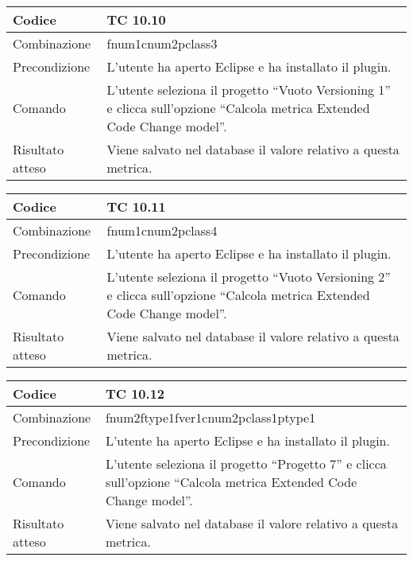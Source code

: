 \begin{table}[ht]
\begin{tabular}{|p{3cm}|p{9cm}|}
\hline
\cellcolor{lightgray}Codice				& TC 10.10								\\
\hline
\cellcolor{lightgray}Combinazione		& fnum1cnum2pclass3									\\
\hline
\cellcolor{lightgray}Precondizione		& L'utente ha aperto Eclipse e ha installato il plugin.		\\
\hline
\cellcolor{lightgray}Comando			& L'utente seleziona il progetto ``Vuoto Versioning 1''  e clicca sull'opzione ``Calcola metrica Extended Code Change model''.	\\
\hline
\cellcolor{lightgray}Risultato atteso	& Viene salvato nel database il valore relativo a questa metrica.\\
\hline
\end{tabular}
\end{table}

\begin{table}[ht]
\begin{tabular}{|p{3cm}|p{9cm}|}
\hline
\cellcolor{lightgray}Codice				& TC 10.11								\\
\hline
\cellcolor{lightgray}Combinazione		& fnum1cnum2pclass4									\\
\hline
\cellcolor{lightgray}Precondizione		& L'utente ha aperto Eclipse e ha installato il plugin.		\\
\hline
\cellcolor{lightgray}Comando			& L'utente seleziona il progetto ``Vuoto Versioning 2''  e clicca sull'opzione ``Calcola metrica Extended Code Change model''.	\\
\hline
\cellcolor{lightgray}Risultato atteso	& Viene salvato nel database il valore relativo a questa metrica.\\
\hline
\end{tabular}
\end{table}

\begin{table}[ht]
\begin{tabular}{|p{3cm}|p{9cm}|}
\hline
\cellcolor{lightgray}Codice				& TC 10.12								\\
\hline
\cellcolor{lightgray}Combinazione		& fnum2ftype1fver1cnum2pclass1ptype1									\\
\hline
\cellcolor{lightgray}Precondizione		& L'utente ha aperto Eclipse e ha installato il plugin.		\\
\hline
\cellcolor{lightgray}Comando			& L'utente seleziona il progetto ``Progetto 7''  e clicca sull'opzione ``Calcola metrica Extended Code Change model''.	\\
\hline
\cellcolor{lightgray}Risultato atteso	& Viene salvato nel database il valore relativo a questa metrica.\\
\hline
\end{tabular}
\end{table}

